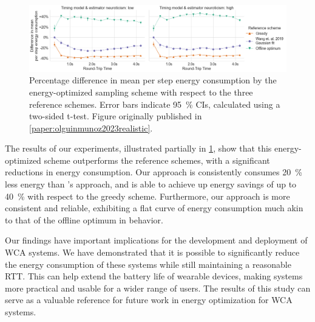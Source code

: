 \begin{figure}
    \centering
    \includegraphics[width=\textwidth]{publications/2023EdgeDroid2/figs/new_model/energy_optimization_diff}
    \caption{%
        Percentage difference in mean per step energy consumption by the energy-optimized sampling scheme with respect to the three reference schemes.
        Error bars indicate \SI{95}{\percent} \glspl{CI}, calculated using a two-sided t-test.
        Figure originally published in \cref{paper:olguinmunoz2023realistic}.
    }\label{fig:energyresults}
\end{figure}

The results of our experiments, illustrated partially in \cref{fig:energyresults}, show that this energy-optimized scheme outperforms the reference schemes, with a significant reductions in energy consumption.
Our approach is consistently consumes \SI{20}{\percent} less energy than \textcite{wang2019towards}'s approach, and is able to achieve up energy savings of up to \SI{40}{\percent} with respect to the greedy scheme.
Furthermore, our approach is more consistent and reliable, exhibiting a flat curve of energy consumption much akin to that of the offline optimum in behavior.

Our findings have important implications for the development and deployment of \gls{WCA} systems.
We have demonstrated that it is possible to significantly reduce the energy consumption of these systems while still maintaining a reasonable \gls{RTT}.
This can help extend the battery life of wearable devices, making  systems more practical and usable for a wider range of users.
The results of this study can serve as a valuable reference for future work in energy optimization for \acl{WCA} systems.
